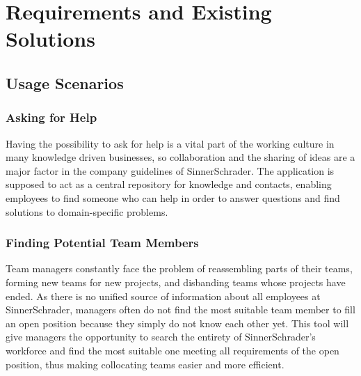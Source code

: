 \chapter{Requirements and Existing Solutions}

\section{Usage Scenarios}
\label{usecases}
\subsection{Asking for Help}
Having the possibility to ask for help is a vital part of the working culture in many knowledge driven
businesses, so collaboration and the sharing of ideas are a major factor in the company guidelines
of SinnerSchrader. The application is supposed to act as a central repository for knowledge and contacts,
enabling employees to find someone who can help in order to answer questions and find solutions to domain-specific problems.

\subsection{Finding Potential Team Members}
Team managers constantly face the problem of reassembling parts of their teams, forming new teams for new projects, and
disbanding teams whose projects have ended. As there is no unified source of information about all employees at SinnerSchrader, managers often
do not find the most suitable team member to fill an open position because they simply do not know each other yet.
This tool will give managers the opportunity to search the entirety of SinnerSchrader's workforce and find the most suitable one
meeting all requirements of the open position, thus making collocating teams easier and more efficient.

\newpage

